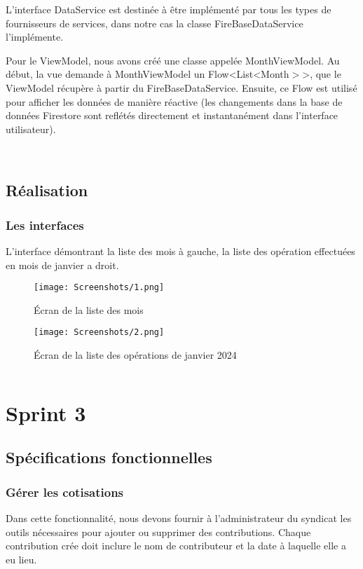 L'interface DataService est destinée à être implémenté par tous les types de fournisseurs de services, dans notre cas la classe FireBaseDataService l'implémente.


Pour le ViewModel, nous avons créé une classe appelée MonthViewModel. Au début, la vue demande à MonthViewModel un Flow<List<Month$>$>, que le ViewModel récupère à partir du FireBaseDataService. Ensuite, ce Flow est utilisé pour afficher les données de manière réactive (les changements dans la base de données Firestore sont reflétés directement et instantanément dans l'interface utilisateur).
\vfill

$ $
\newpage
$ $
\subsection{Réalisation}
\subsubsection{Les interfaces}
L'interface démontrant la liste des mois  à gauche, la liste des opération effectuées en mois de janvier a droit.
\begin{figure}[!htbp]
  \begin{minipage}[t]{0.4\textwidth}    %
          \texttt{[image: Screenshots/1.png]}
          \caption{ Écran de la liste des mois}
  \end{minipage}%
  \begin{minipage}{0.20\textwidth}
    \hfill
  \end{minipage}
\begin{minipage}[t]{0.4\textwidth}
        \texttt{[image: Screenshots/2.png]}
        \caption{ Écran de la liste des opérations de janvier 2024}
\end{minipage}%
  \end{figure}
$ $
\newpage
\section{Sprint 3}
\subsection{Spécifications fonctionnelles}
\subsubsection{Gérer les cotisations}
Dans cette fonctionnalité, nous devons fournir à l'administrateur du syndicat les outils nécessaires pour ajouter ou supprimer des contributions. Chaque contribution crée doit inclure le nom de contributeur et la date à laquelle elle a eu lieu.
